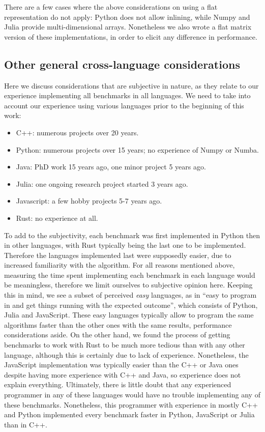 \documentclass[11pt,a4paper,notitlepage]{article}
\begin{document}
There are a few cases where the above considerations on using a flat
representation do not apply: Python does not allow inlining, while
Numpy and Julia provide multi-dimensional arrays. Nonetheless we also
wrote a flat matrix version of these implementations, in order
to elicit any difference in performance. 

\subsection{Other general cross-language considerations}
Here we discuss considerations that are subjective in nature, as they
relate to our experience implementing all benchmarks in all
languages. We need to take into account our experience using various
languages prior to the beginning of this work:
\begin{itemize}
\item C++: numerous projects over 20 years.
\item Python: numerous projects over 15 years; no experience of Numpy
  or Numba.
\item Java: PhD work 15 years ago, one minor project 5 years ago.
\item Julia: one ongoing research project started 3 years ago.
\item Javascript: a few hobby projects 5-7 years ago.
\item Rust: no experience at all.
\end{itemize}
To add to the subjectivity, each benchmark was first implemented in
Python then in other languages, with Rust typically being the last one
to be implemented. Therefore the languages implemented last were
supposedly easier, due to increased familiarity with the
algorithm. For all reasons mentioned above, measuring the
time spent implementing each benchmark in each language would be
meaningless, therefore we limit ourselves to subjective opinion here.
Keeping this in mind, we see a subset of perceived
\emph{easy} languages, as in ``easy to program in and get things running
with the expected outcome'', which consists of Python, Julia and
JavaScript. These 
easy languages typically allow to program the same algorithms faster
than the other ones with the same results, performance considerations
aside.
On the other hand, we found the process of getting benchmarks to work
with Rust to be much more tedious than with any other language,
although this is certainly due to lack of experience. Nonetheless, the
JavaScript implementation was typically easier than the C++ or Java ones
despite having more experience with C++ and Java, so
experience does not explain everything.
Ultimately, there is little doubt that any experienced programmer in
any of these languages would have no trouble implementing any of these
benchmarks. Nonetheless, this programmer with experience in mostly C++
and Python implemented every benchmark faster in Python, JavaScript or Julia
than in C++.
\end{document}

